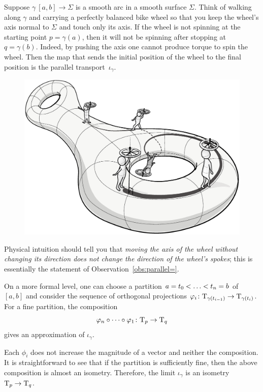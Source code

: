 Suppose $\gamma\:[a,b]\to\Sigma$ is a smooth arc in a smooth surface $\Sigma$.
Think of walking along $\gamma$ and carrying a perfectly balanced bike wheel so that you keep the wheel's axis normal to $\Sigma$ and touch only its axis.
If the wheel is not spinning at the starting point $p=\gamma(a)$, then it will not be spinning after stopping at~$q=\gamma(b)$.
Indeed, by pushing the axis one cannot produce torque to spin the wheel.
Then the map that sends the initial position of the wheel to the final position is the parallel transport~$\iota_\gamma$.

\begin{figure}[ht!]
\vskip-0mm
\centering
\includegraphics[scale=.3]{pics/parallel_transport}
\end{figure}

Physical intuition should tell you that \textit{moving the axis of the wheel without changing its direction does not change the direction of the wheel's spokes};
this is essentially the statement of Observation~\ref{obs:parallel=}.

On a more formal level, one can choose a partition $a=t_0<\dots\z<t_n=b$ of $[a,b]$
and consider the sequence of orthogonal projections $\varphi_i\colon\mathrm{T}_{\gamma(t_{i-1})}\to\mathrm{T}_{\gamma(t_i)}$.
For a fine partition, the composition 
\[\phi_n\circ\dots\circ\phi_1\:\T_p\z\to\T_q\]
gives an approximation of $\iota_\gamma$.

Each $\phi_i$ does not increase the magnitude of a vector and neither the composition.
It is straightforward to see that if the partition is sufficiently fine, then the above composition is almost an isometry.
Therefore, the limit $\iota_\gamma$ is an isometry $\T_p\z\to\T_q$.

